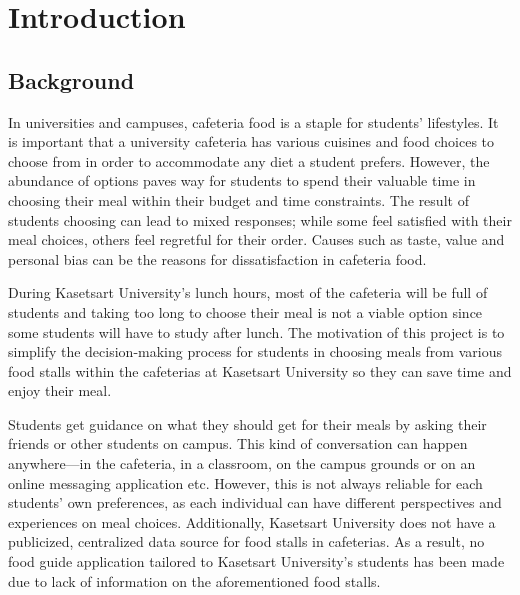 \newcommand{\persona}[4]{%
    \textbf{#1}
    \small\begin{tabular}[t]{|p{.8in} | p{1.5in}|}
        \hline
        \textbf{Preferences} & #2 \\\hline
        \textbf{Pain Points} & #3 \\\hline
        \textbf{Goals} & #4 \\
        \hline
    \end{tabular}
    \vspace{4pt}
}


\chapter{Introduction}
\label{chap:introduction}

\section{Background}
\label{section:background}

In universities and campuses, cafeteria food is a staple for students' lifestyles.
It is important that a university cafeteria has various cuisines and food choices to choose from in order to accommodate
any diet a student prefers. However, the abundance of options paves way for students to spend their valuable time in choosing
their meal within their budget and time constraints. The result of students choosing can lead to mixed responses;
while some feel satisfied with their meal choices, others feel regretful for their order.
Causes such as taste, value and personal bias can be the reasons for dissatisfaction in cafeteria food.

During Kasetsart University's lunch hours,
most of the cafeteria will be full of students and taking too long to choose their meal is not a viable option
since some students will have to study after lunch. The motivation of this project is to simplify
the decision-making process for students in choosing meals from various food stalls within
the cafeterias at Kasetsart University so they can save time and enjoy their meal.

Students get guidance on what they should get for their meals by asking their friends or other students on campus.
This kind of conversation can happen anywhere---in the cafeteria, in a classroom, on the campus grounds or on an online messaging application etc.
However, this is not always reliable for each students' own preferences, as each individual can have different perspectives
and experiences on meal choices. Additionally, Kasetsart University does not have a publicized, centralized data source
for food stalls in cafeterias. As a result, no food guide application tailored to Kasetsart University's students
has been made due to lack of information on the aforementioned food stalls.

